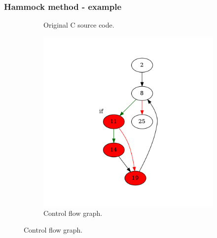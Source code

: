 \documentclass[aspectratio=1610]{beamer}
\begin{document}
\begin{frame}
	\frametitle{Hammock method - example}
	\begin{figure}[htbp]
		\centering
		\begin{subfigure}[b]{0.30\textwidth}
			\centering
			
			\caption{Original C source code.}
		\end{subfigure}
		\begin{subfigure}[b]{0.50\textwidth}
			\centering
			\includegraphics[height=0.6\paperheight]{inc/methods/hammock/example/without-break/main_0002a.png}
			\caption{Control flow graph.}
		\end{subfigure}
	\end{figure}
\end{frame}
\end{document}
